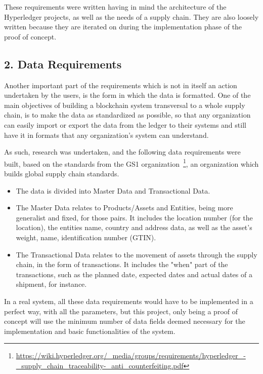 These requirements were written having in mind the architecture of the Hyperledger projects, as well as the needs of a supply chain. They are also loosely written because they are iterated on during the implementation phase of the proof of concept.

\subsection*{2. Data Requirements}

Another important part of the requirements which is not in itself an action undertaken by the users, is the form in which the data is formatted. One of the main objectives of building a blockchain system transversal to a whole supply chain, is to make the data as standardized as possible, so that any organization can easily import or export the data from the ledger to their systems and still have it in formats that any organization's system can understand. 

As such, research was undertaken, and the following data requirements were built, based on the standards from the GS1 organization~\footnote{\url{https://wiki.hyperledger.org/\_media/groups/requirements/hyperledger\_-\_supply\_chain\_traceability-\_anti\_counterfeiting.pdf}}, an organization which builds global supply chain standards.

\begin{itemize}
	\item The data is divided into Master Data and Transactional Data.
	\item The Master Data relates to Products/Assets and Entities, being more generalist and fixed, for those pairs. It includes the location number (for the location), the entities name, country and address data, as well as the asset's weight, name, identification number (GTIN).
	\item The Transactional Data relates to the movement of assets through the supply chain, in the form of transactions. It includes the "when" part of the transactions, such as the planned date, expected dates and actual dates of a shipment, for instance.
\end{itemize}

In a real system, all these data requirements would have to be implemented in a perfect way, with all the parameters, but this project, only being a proof of concept will use the minimum number of data fields deemed necessary for the implementation and basic functionalities of the system.
		
